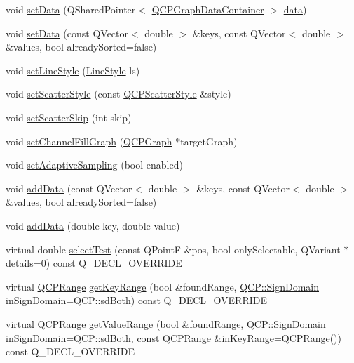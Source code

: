 \begin{DoxyCompactItemize}
\item 
void \hyperlink{classQCPGraph_a1eae9429a316b008e2d99b2d65a54395}{set\+Data} (Q\+Shared\+Pointer$<$ \hyperlink{classQCPDataContainer}{Q\+C\+P\+Graph\+Data\+Container} $>$ \hyperlink{classQCPGraph_a04514a2b1fb61a280ead66abe80b89ab}{data})
\item 
void \hyperlink{classQCPGraph_a73578d786532132310a926c3cd529b29}{set\+Data} (const Q\+Vector$<$ double $>$ \&keys, const Q\+Vector$<$ double $>$ \&values, bool already\+Sorted=false)
\item 
void \hyperlink{classQCPGraph_a513fecccff5b2a50ce53f665338c60ff}{set\+Line\+Style} (\hyperlink{classQCPGraph_ad60175cd9b5cac937c5ee685c32c0859}{Line\+Style} ls)
\item 
void \hyperlink{classQCPGraph_a12bd17a8ba21983163ec5d8f42a9fea5}{set\+Scatter\+Style} (const \hyperlink{classQCPScatterStyle}{Q\+C\+P\+Scatter\+Style} \&style)
\item 
void \hyperlink{classQCPGraph_a17cebd3196f434258abb82ba6dc443f2}{set\+Scatter\+Skip} (int skip)
\item 
void \hyperlink{classQCPGraph_a2d03156df1b64037a2e36cfa50351ca3}{set\+Channel\+Fill\+Graph} (\hyperlink{classQCPGraph}{Q\+C\+P\+Graph} $\ast$target\+Graph)
\item 
void \hyperlink{classQCPGraph_ab468cd600160f327836aa0644291e64c}{set\+Adaptive\+Sampling} (bool enabled)
\item 
void \hyperlink{classQCPGraph_ae0555c0d3fe0fa7cb8628f88158d420f}{add\+Data} (const Q\+Vector$<$ double $>$ \&keys, const Q\+Vector$<$ double $>$ \&values, bool already\+Sorted=false)
\item 
void \hyperlink{classQCPGraph_a0bf98b1972286cfb7b1c4b7dd6ae2012}{add\+Data} (double key, double value)
\item 
virtual double \hyperlink{classQCPGraph_a6d669d04462d272c6aa0e5f85846d673}{select\+Test} (const Q\+PointF \&pos, bool only\+Selectable, Q\+Variant $\ast$details=0) const Q\+\_\+\+D\+E\+C\+L\+\_\+\+O\+V\+E\+R\+R\+I\+DE
\item 
virtual \hyperlink{classQCPRange}{Q\+C\+P\+Range} \hyperlink{classQCPGraph_aac47c6189e3aea46ea46939e5d14796c}{get\+Key\+Range} (bool \&found\+Range, \hyperlink{namespaceQCP_afd50e7cf431af385614987d8553ff8a9}{Q\+C\+P\+::\+Sign\+Domain} in\+Sign\+Domain=\hyperlink{namespaceQCP_afd50e7cf431af385614987d8553ff8a9aa38352ef02d51ddfa4399d9551566e24}{Q\+C\+P\+::sd\+Both}) const Q\+\_\+\+D\+E\+C\+L\+\_\+\+O\+V\+E\+R\+R\+I\+DE
\item 
virtual \hyperlink{classQCPRange}{Q\+C\+P\+Range} \hyperlink{classQCPGraph_a8f773e56f191a61c06e129e90a604d77}{get\+Value\+Range} (bool \&found\+Range, \hyperlink{namespaceQCP_afd50e7cf431af385614987d8553ff8a9}{Q\+C\+P\+::\+Sign\+Domain} in\+Sign\+Domain=\hyperlink{namespaceQCP_afd50e7cf431af385614987d8553ff8a9aa38352ef02d51ddfa4399d9551566e24}{Q\+C\+P\+::sd\+Both}, const \hyperlink{classQCPRange}{Q\+C\+P\+Range} \&in\+Key\+Range=\hyperlink{classQCPRange}{Q\+C\+P\+Range}()) const Q\+\_\+\+D\+E\+C\+L\+\_\+\+O\+V\+E\+R\+R\+I\+DE
\end{DoxyCompactItemize}
